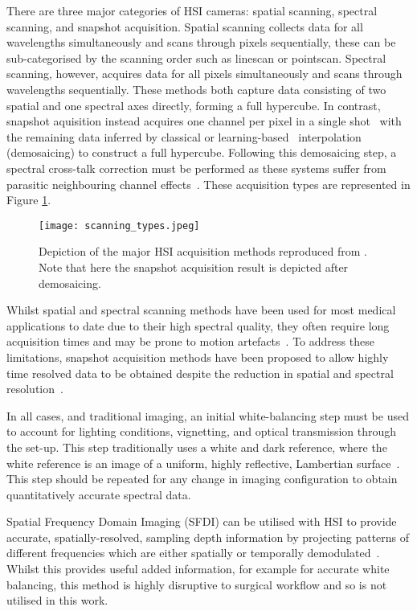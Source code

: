 There are three major categories of HSI cameras: spatial scanning, spectral scanning, and snapshot acquisition. Spatial scanning collects data for all wavelengths simultaneously and scans through pixels sequentially, these can be sub-categorised by the scanning order such as linescan or pointscan. Spectral scanning, however, acquires data for all pixels simultaneously and scans through wavelengths sequentially. These methods both capture data consisting of two spatial and one spectral axes directly, forming a full hypercube. In contrast, snapshot aquisition instead acquires one channel per pixel in a single shot~\cite{Geelen2014} with the remaining data inferred by classical or learning-based~\cite{Li2021} interpolation (demosaicing) to construct a full hypercube. Following this demosaicing step, a spectral cross-talk correction must be performed as these systems suffer from parasitic neighbouring channel effects~\cite{Pichette2017}. These acquisition types are represented in Figure \ref{fig:scanning}. 
\begin{figure}[h]
    \centering
    \texttt{[image: scanning\_types.jpeg]}
    \caption{Depiction of the major HSI acquisition methods reproduced from \cite{Araujo-Andrade2021}. Note that here the snapshot acquisition result is depicted after demosaicing.}
    \label{fig:scanning}
\end{figure}

Whilst spatial and spectral scanning methods have been used for most medical applications to date due to their high spectral quality, they often require long acquisition times and may be prone to motion artefacts~\cite{Kulcke2018, Giannoni2021, Shapey2019, Yoon2021}. To address these limitations, snapshot acquisition methods have been proposed to allow highly time resolved data to be obtained despite the reduction in spatial and spectral resolution~\cite{Ayala2021, Ebner2021}. 

In all cases, and traditional imaging, an initial white-balancing step must be used to account for lighting conditions, vignetting, and optical transmission through the set-up. This step traditionally uses a white and dark reference, where the white reference is an image of a uniform, highly reflective, Lambertian surface~\cite{Lu2014}. This step should be repeated for any change in imaging configuration to obtain quantitatively accurate spectral data. 

Spatial Frequency Domain Imaging (SFDI) can be utilised with HSI to provide accurate, spatially-resolved, sampling depth information by projecting patterns of different frequencies which are either spatially or temporally demodulated~\cite{Gioux2019}. Whilst this provides useful added information, for example for accurate white balancing, this method is highly disruptive to surgical workflow and so is not utilised in this work. 

